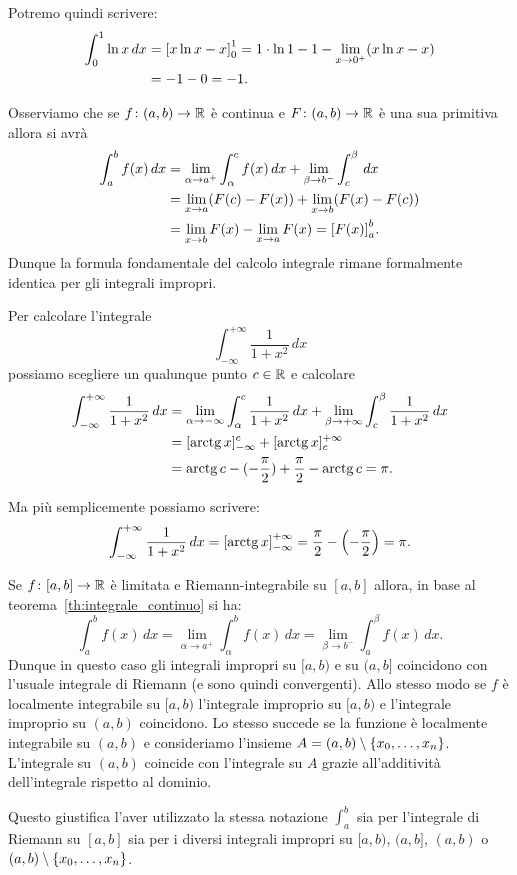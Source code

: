 Potremo quindi scrivere:
\begin{align*}
  \int_0^1 \ln x\, dx
  &= {\left[ x\ln x- x \right]}_0^1
  = 1 \cdot\ln 1 -1 - \lim_{x\to 0^+} (x\ln x - x) \\
  &= -1  - 0 = -1.
\end{align*}

Osserviamo che se $f\colon(a,b) \to \mathbb R$ è continua e $F\colon(a,b)\to \mathbb R$
è una sua primitiva
allora si avrà
\begin{align*}
  \int_a^b f(x)\, dx
   &= \lim_{\alpha\to a^+}\int_{\alpha}^c f(x)\, dx
   + \lim_{\beta\to b^-}\int_c^{\beta}\, dx \\
   & = \lim_{x\to a} (F(c)-F(x)) + \lim_{x\to b} (F(x)-F(c)) \\
   & = \lim_{x\to b} F(x) - \lim_{x\to a} F(x)
   = {\left[ F(x) \right]}_a^b.
\end{align*}
Dunque la formula fondamentale del calcolo integrale rimane formalmente identica
per gli integrali impropri.

\begin{example}
Per calcolare l'integrale
\[
  \int_{-\infty}^{+\infty} \frac{1}{1+x^2}\, dx
\]
possiamo scegliere un qualunque punto $c\in \mathbb R$ e calcolare
\begin{align*}
\int_{-\infty}^{+\infty}\frac{1}{1+x^2}\, dx
&=
\lim_{\alpha\to-\infty}\int_\alpha^c \frac{1}{1+x^2}\, dx
  + \lim_{\beta\to+\infty}\int_c^\beta \frac{1}{1+x^2}\, dx\\
  &= [\operatorname{arctg} x]_{-\infty}^c
  + [\operatorname{arctg} x]_c^{+\infty}  \\
  &= \operatorname{arctg} c - (-\frac\pi 2) + \frac \pi 2 - \operatorname{arctg} c
  = \pi.
\end{align*}

Ma più semplicemente possiamo scrivere:
\[
 \int_{-\infty}^{+\infty}\frac{1}{1+x^2}\, dx
 = {\left[ \operatorname{arctg} x \right]}_{-\infty}^{+\infty}
 = \frac \pi 2 - {\left( -\frac \pi 2 \right)} = \pi.
 \]

\end{example}

\begin{remark}
Se $f\colon[a,b]\to\mathbb R$ è limitata e Riemann-integrabile su
$[a,b]$ allora,
in base al teorema~\ref{th:integrale_continuo}
si ha:
\[
 \int_a^b f(x)\, dx
  = \lim_{\alpha \to a^+} \int_\alpha^b f(x)\, dx
  = \lim_{\beta\to b^-}\int_a^\beta f(x)\,dx.
\]
Dunque in questo caso gli integrali impropri su $[a,b)$ e su $(a,b]$ coincidono
con l'usuale integrale di Riemann (e sono quindi convergenti).
Allo stesso modo se $f$ è localmente integrabile su $[a,b)$
l'integrale improprio su $[a,b)$ e l'integrale improprio su
$(a,b)$ coincidono.
Lo stesso succede se la funzione è localmente integrabile
su $(a,b)$ e consideriamo l'insieme $A=(a,b)\setminus{\left\{ x_0,\dots,x_n \right\}}$.
L'integrale su $(a,b)$ coincide con l'integrale su $A$ grazie all'additività
dell'integrale rispetto al dominio.

Questo giustifica l'aver utilizzato la stessa notazione $\int_a^b$ sia per l'integrale
di Riemann su $[a,b]$ sia per i diversi integrali impropri su $[a,b)$, $(a,b]$,
$(a,b)$ o $(a,b)\setminus{\left\{ x_0, \dots, x_n \right\}}$.
\end{remark}

